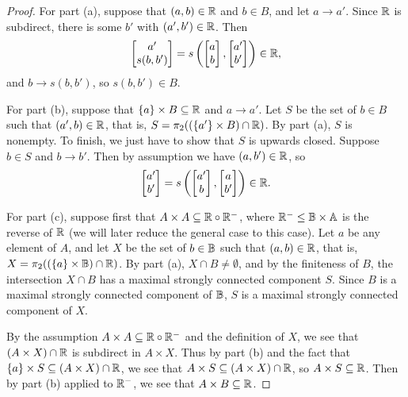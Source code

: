 \documentclass[letterpaper,11pt]{article}
\begin{document}
\begin{proof} For part (a), suppose that $(a,b) \in \mathbb{R}$ and $b \in B$, and let $a \rightarrow a'$. Since $\mathbb{R}$ is subdirect, there is some $b'$ with $(a',b') \in \mathbb{R}$. Then
\[
\begin{bmatrix} a'\\ s(b,b')\end{bmatrix} = s\left(\begin{bmatrix} a\\ b\end{bmatrix}, \begin{bmatrix} a'\\ b'\end{bmatrix}\right) \in \mathbb{R},
\]
and $b \rightarrow s(b,b')$, so $s(b,b') \in B$.

For part (b), suppose that $\{a\}\times B \subseteq \mathbb{R}$ and $a \rightarrow a'$. Let $S$ be the set of $b \in B$ such that $(a',b) \in \mathbb{R}$, that is, $S = \pi_2((\{a'\}\times B) \cap \mathbb{R})$. By part (a), $S$ is nonempty. To finish, we just have to show that $S$ is upwards closed. Suppose $b \in S$ and $b \rightarrow b'$. Then by assumption we have $(a,b') \in \mathbb{R}$, so
\[
\begin{bmatrix} a'\\ b'\end{bmatrix} = s\left(\begin{bmatrix} a'\\ b\end{bmatrix}, \begin{bmatrix} a\\ b'\end{bmatrix}\right) \in \mathbb{R}.
\]

For part (c), suppose first that $A \times A \subseteq \mathbb{R}\circ \mathbb{R}^-$, where $\mathbb{R}^- \le \mathbb{B} \times \mathbb{A}$ is the reverse of $\mathbb{R}$ (we will later reduce the general case to this case). Let $a$ be any element of $A$, and let $X$ be the set of $b \in \mathbb{B}$ such that $(a,b) \in \mathbb{R}$, that is, $X = \pi_2((\{a\}\times \mathbb{B}) \cap \mathbb{R})$. By part (a), $X \cap B \ne \emptyset$, and by the finiteness of $B$, the intersection $X \cap B$ has a maximal strongly connected component $S$. Since $B$ is a maximal strongly connected component of $\mathbb{B}$, $S$ is a maximal strongly connected component of $X$.

By the assumption $A \times A \subseteq \mathbb{R}\circ \mathbb{R}^-$ and the definition of $X$, we see that $(A\times X)\cap \mathbb{R}$ is subdirect in $A\times X$. Thus by part (b) and the fact that $\{a\} \times S \subseteq (A\times X)\cap \mathbb{R}$, we see that $A \times S \subseteq (A\times X)\cap \mathbb{R}$, so $A \times S \subseteq \mathbb{R}$. Then by part (b) applied to $\mathbb{R}^-$, we see that $A \times B \subseteq \mathbb{R}$.


\end{proof}
\end{document}
